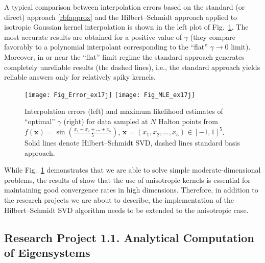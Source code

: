 \documentclass[11pt]{NSFamsart}
\newcommand{\bx}{{\boldsymbol{x}}}
\begin{document}
A typical comparison between interpolation errors based on the standard (or direct) approach \eqref{rbfapprox} and the Hilbert--Schmidt approach applied to isotropic Gaussian kernel interpolation is shown in the left plot of Fig.~\ref{Fig_HSSVD}. The most accurate results are obtained for a positive value of $\gamma$ (they compare favorably to a polynomial interpolant corresponding to the ``flat'' $\gamma\to0$ limit). Moreover, in or near the ``flat'' limit regime the standard approach generates completely unreliable results (the dashed lines), i.e., the standard approach yields reliable answers only for relatively spiky kernels.

\begin{figure}[h]
    \centering
    \texttt{[image: Fig\_Error\_ex17j]}
    \texttt{[image: Fig\_MLE\_ex17j]}
\caption{Interpolation errors (left) and maximum likelihood estimates of ``optimal'' $\gamma$ (right) for data sampled at $N$ Halton points from $f(\bx) = \sin\left(\tfrac{x_1+x_2+\ldots+x_5}{5}\right)$, $\bx=(x_1,x_2,\ldots,x_5) \in [-1,1]^5$. Solid lines denote Hilbert--Schmidt SVD, dashed lines standard basis approach.}\label{Fig_HSSVD}
\end{figure}

While Fig.~\ref{Fig_HSSVD} demonstrates that we are able to solve simple moderate-dimensional problems, the results of \cite{FasHicWoz12b, FasHicWoz12a} show that the use of anisotropic kernels is essential for maintaining good convergence rates in high dimensions. Therefore, in addition to the research projects we are about to describe, the implementation of the Hilbert--Schmidt SVD algorithm needs to be extended to the anisotropic case.

\subsection*{Research Project 1.1. Analytical Computation of Eigensystems} \label{AnalyticEigensubsec}
\end{document}
